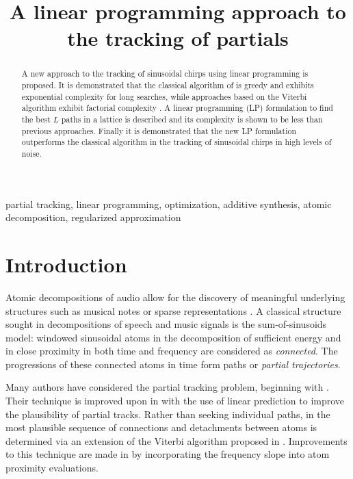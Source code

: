 \documentclass{article}
\title{A linear programming approach to the tracking of partials}
\begin{document}
\ninept
\maketitle

\begin{sloppy}

\begin{abstract}
    A new approach to the tracking of sinusoidal chirps using linear programming
    is proposed. It is demonstrated that the classical algorithm of
    \cite{mcaulay1986speech} is greedy and exhibits exponential complexity for
    long searches, while approaches based on the Viterbi algorithm exhibit
    factorial complexity \cite{depalle1993tracking} \cite{wolf1989finding}. A
    linear programming (LP) formulation to find the best $L$ paths in a lattice
    is described and its complexity is shown to be less than previous
    approaches. Finally it is demonstrated that the new LP formulation
    outperforms the classical algorithm in the tracking of sinusoidal chirps in
    high levels of noise.
\end{abstract}

\begin{keywords}
partial tracking, linear programming, optimization, additive synthesis, atomic
decomposition, regularized approximation
\end{keywords}

\section{Introduction}

Atomic decompositions of audio allow for the discovery of meaningful underlying
structures such as musical notes \cite{gribonval2003harmonic} or sparse
representations \cite{plumbley2010sparse}. A classical structure sought in
decompositions of speech and music signals is the sum-of-sinusoids model: windowed sinusoidal atoms in the
decomposition of sufficient energy and in close proximity in both time and
frequency are considered as \textit{connected}. The progressions of these
connected atoms in time form paths or \textit{partial trajectories}.

Many authors have considered the partial tracking problem, beginning with
\cite{mcaulay1986speech}. Their technique is improved upon
in \cite{lagrange2003enhanced} with the use of linear prediction to improve the
plausibility of partial tracks. Rather than seeking individual paths, in
\cite{depalle1993tracking} the most plausible sequence of connections and
detachments between atoms is determined via an extension of the Viterbi
algorithm proposed in \cite{wolf1989finding}. Improvements to this technique are
made in \cite{kereliuk2008improved} by incorporating the frequency slope into
atom proximity evaluations.


\end{sloppy}
\end{document}
